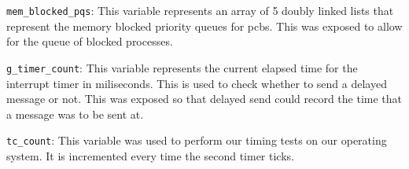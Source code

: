 \documentclass[se]{uw-wkrpt}
\begin{document}
\begin{appendices}
\texttt{mem\_blocked\_pqs}: This variable represents an array of 5 doubly linked lists that represent the memory blocked priority queues for pcbs. This was exposed to allow for the queue of blocked processes.

\texttt{g\_timer\_count}: This variable represents the current elapsed time for the interrupt timer in miliseconds. This is used to check whether to send a delayed message or not. This was exposed so that delayed send could record the time that a message was to be sent at.

\texttt{tc\_count}: This variable was used to perform our timing tests on our operating system. It is incremented every time the second timer ticks.

\end{appendices}
\end{document}
